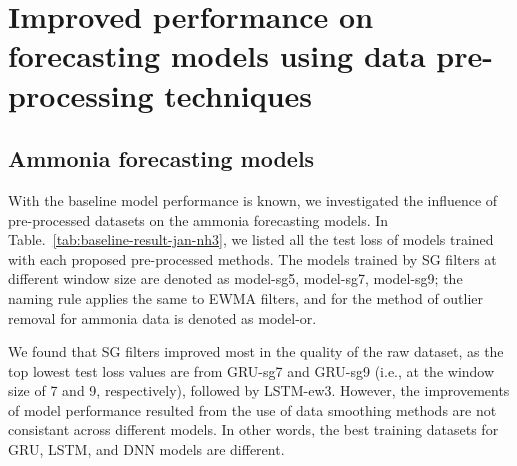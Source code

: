 \section{Improved performance on forecasting models using data pre-processing techniques}
\subsection{Ammonia forecasting models}
With the baseline model performance is known, we investigated the influence of pre-processed datasets on the ammonia forecasting models. In Table.~\ref{tab:baseline-result-jan-nh3}, we listed all the test loss of models trained with each proposed pre-processed methods. The models trained by SG filters at different window size are denoted as model-sg5, model-sg7, model-sg9; the naming rule applies the same to EWMA filters, and for the method of outlier removal for ammonia data is denoted as model-or.

We found that SG filters improved most in the quality of the raw dataset, as the top lowest test loss values are from GRU-sg7 and GRU-sg9 (i.e., at the window size of 7 and 9, respectively), followed by LSTM-ew3. However, the improvements of model performance resulted from the use of data smoothing methods are not consistant across different models. In other words, the best training datasets for GRU, LSTM, and DNN models are different.

